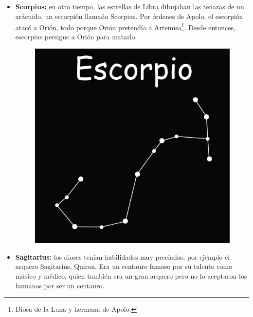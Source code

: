 \documentclass[10pt,a4paper]{article}
\begin{document}
\begin{itemize}
 \item \textbf{Scorpius:} en otro tiempo, las estrellas de Libra dibujaban las tenazas de un arácnido, un escorpión llamado Scorpius. Por órdenes de Apolo, el escorpión atacó a Orión, todo porque Orión pretendía a Artemisa\footnote{Diosa de la Luna y hermana de Apolo.}. Desde entonces, escorpius persigue a Orión para matarlo.
 
\begin{figure}[H]
\centering
\includegraphics[scale=0.18]{Imagenes/Escorpio_01}
\end{figure} 
 
 \item \textbf{Sagitarius:} los dioses tenían habilidades muy preciadas, por ejemplo el arquero Sagitarius, Quiron. Era un centauro famoso por su talento como músico y médico, quien también era un gran arquero pero no lo aceptaron los humanos por ser un centauro.
 

\end{itemize}
\end{document}
